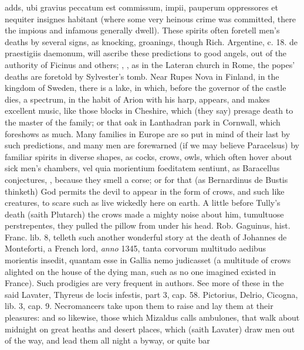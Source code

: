 {{adds, ubi gravius peccatum est commissum, impii, pauperum oppressores
et nequiter insignes habitant (where some very heinous crime was
committed, there the impious and infamous generally dwell). These
spirits often foretell men's deaths by several signs, as knocking,
groanings, \etc{} though Rich. Argentine, c. 18. \textlatin{de praestigiis
daemonum}, will ascribe these predictions to good angels, out of the
authority of Ficinus and others; , \etc{}, as in the Lateran church in Rome, the popes'
deaths are foretold by Sylvester's tomb. Near Rupes Nova in Finland, in
the kingdom of Sweden, there is a lake, in which, before the governor
of the castle dies, a spectrum, in the habit of Arion with his harp,
appears, and makes excellent music, like those blocks in Cheshire,
which (they say) presage death to the master of the family; or that
oak in Lanthadran park in Cornwall, which foreshows as much. Many
families in Europe are so put in mind of their last by such
predictions, and many men are forewarned (if we may believe Paracelsus)
by familiar spirits in diverse shapes, as cocks, crows, owls, which
often hover about sick men's chambers, vel quia morientium foeditatem
sentiunt, as Baracellus conjectures, , because they smell a corse; or for that (as
Bernardinus de Bustis thinketh) God permits the devil to appear
in the form of crows, and such like creatures, to scare such as live
wickedly here on earth. A little before Tully's death (saith Plutarch)
the crows made a mighty noise about him, tumultuose perstrepentes, they
pulled the pillow from under his head. Rob. Gaguinus, hist. Franc. lib.
8, telleth such another wonderful story at the death of Johannes de
Monteforti, a French lord, \emph{anno} 1345, tanta corvorum multitudo
aedibus morientis insedit, quantam esse in Gallia nemo judicasset (a
multitude of crows alighted on the house of the dying man, such as no
one imagined existed in France). Such prodigies are very frequent in
authors. See more of these in the said Lavater, Thyreus de locis
infestis, part 3, cap. 58. Pictorius, Delrio, Cicogna, lib. 3, cap. 9.
Necromancers take upon them to raise and lay them at their pleasures:
and so likewise, those which Mizaldus calls ambulones, that walk about
midnight on great heaths and desert places, which (saith Lavater)
draw men out of the way, and lead them all night a byway, or quite bar
}}
